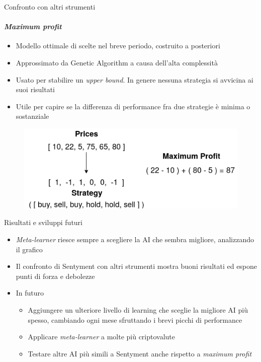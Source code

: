 \documentclass{beamer}
\begin{document}
\begin{frame}{Confronto con altri strumenti}
\framesubtitle{\textit{Maximum profit}}
\begin{itemize}
\item Modello ottimale di scelte nel breve periodo, costruito a posteriori
\item Approssimato da Genetic Algorithm a causa dell'alta complessità
\item Usato per stabilire un \textit{upper bound}. In genere nessuna strategia si avvicina ai suoi risultati
\item Utile per capire se la differenza di performance fra due strategie è minima o sostanziale
\end{itemize}
\begin{figure}
        \centering
        \includegraphics[width=.5\linewidth]{maxprof}
\end{figure}
\end{frame}


\begin{frame}{Risultati e sviluppi futuri}
\begin{itemize}
    \item \textit{Meta-learner} riesce sempre a scegliere la AI che sembra migliore, analizzando il grafico
    \item Il confronto di Sentyment con altri strumenti mostra buoni risultati ed espone punti di forza e debolezze
    \item In futuro 
    \begin{itemize}
        \item Aggiungere un ulteriore livello di learning che sceglie la migliore AI più spesso, cambiando ogni mese sfruttando i brevi picchi di performance
        \item Applicare \textit{meta-learner} a molte più criptovalute
        \item Testare altre AI più simili a Sentyment anche rispetto a \textit{maximum profit}
    \end{itemize}
\end{itemize}
\end{frame}
\end{document}
